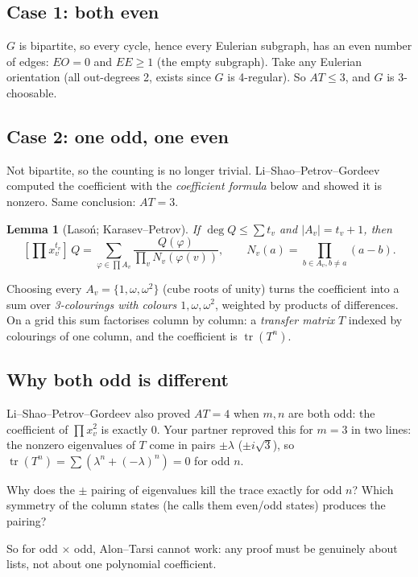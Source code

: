 \documentclass[11pt]{article}
\theoremstyle{plain}
\newtheorem{lemma}[theorem]{Lemma}
\theoremstyle{definition}
\begin{document}
\subsection*{Case 1: both even}
$G$ is bipartite, so every cycle, hence every Eulerian subgraph, has an even number of
edges: $EO=0$ and $EE\ge1$ (the empty subgraph). Take any Eulerian orientation (all
out-degrees 2, exists since $G$ is 4-regular). So $AT\le3$, and $G$ is 3-choosable.

\subsection*{Case 2: one odd, one even}
Not bipartite, so the counting is no longer trivial. Li--Shao--Petrov--Gordeev computed the
coefficient with the \emph{coefficient formula} below and showed it is nonzero. Same
conclusion: $AT=3$.

\begin{lemma}[Laso\'n; Karasev--Petrov]
If $\deg Q\le\sum t_v$ and $|A_v|=t_v+1$, then
\[
[\textstyle\prod x_v^{t_v}]\,Q=\sum_{\varphi\in\prod A_v}\dfrac{Q(\varphi)}{\prod_v N_v(\varphi(v))},
\qquad N_v(a)=\prod_{b\in A_v,b\ne a}(a-b).
\]
\end{lemma}

Choosing every $A_v=\{1,\omega,\omega^2\}$ (cube roots of unity) turns the coefficient into a
sum over \emph{3-colourings with colours $1,\omega,\omega^2$}, weighted by products of
differences. On a grid this sum factorises column by column: a \emph{transfer matrix}
$T$ indexed by colourings of one column, and the coefficient is $\operatorname{tr}(T^n)$.

\subsection*{Why both odd is different}
Li--Shao--Petrov--Gordeev also proved $AT=4$ when $m,n$ are both odd: the coefficient of
$\prod x_v^2$ is exactly $0$. Your partner reproved this for $m=3$ in two lines: the
nonzero eigenvalues of $T$ come in pairs $\pm\lambda$ ($\pm i\sqrt3$), so
$\operatorname{tr}(T^n)=\sum(\lambda^n+(-\lambda)^n)=0$ for odd $n$.

\begin{ponder}
Why does the $\pm$ pairing of eigenvalues kill the trace exactly for odd $n$? Which symmetry
of the column states (he calls them even/odd states) produces the pairing?
\end{ponder}

So for odd $\times$ odd, Alon--Tarsi cannot work: any proof must be genuinely about
lists, not about one polynomial coefficient.
\end{document}

